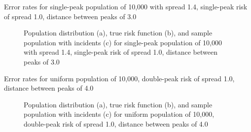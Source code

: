 {%

\begin{table}[H]
    
    \caption[]{Error rates for single-peak population of 10,000 with \gls{spread} 1.4, single-peak risk of \gls{spread} 1.0, distance between peaks of 3.0}
    \label{tab:mean_error_rates:p1.4_100_1_1h_3s}
\end{table}

\begin{figure}[H]
    
    \caption[]{Population distribution (a), true risk function (b), and sample population with incidents (c) for single-peak population of 10,000 with \gls{spread} 1.4, single-peak risk of \gls{spread} 1.0, distance between peaks of 3.0}
    \label{fig:distributions:p1.4_100_1_1h_3s}    
\end{figure} \newpage


\begin{table}[H]
    
    \caption[]{Error rates for uniform population of 10,000, double-peak risk of spread 1.0, distance between peaks of 4.0}
    \label{tab:mean_error_rates:p1.4_100_1_1h_4s}
\end{table}

\begin{figure}[H]
    
    \caption[]{Population distribution (a), true risk function (b), and sample population with incidents (c) for uniform population of 10,000, double-peak risk of \gls{spread} 1.0, distance between peaks of 4.0}
    \label{fig:distributions:p1.4_100_1_1h_4s}    
\end{figure} \newpage

\setpath{}
}